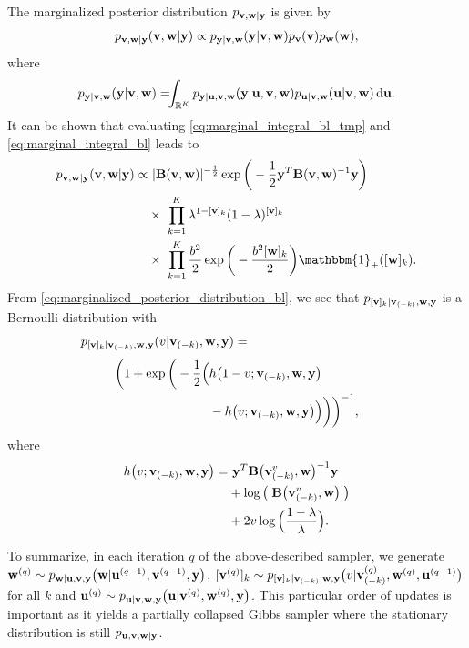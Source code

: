 \documentclass[journal]{IEEEtran}
\begin{document}
The marginalized posterior distribution $p_{{\bf{v}}, {\bf{w}} | {\bf{y}}}$ is given by
\begin{align}\label{eq:marginal_integral_bl_tmp}
    p_{{\bf{v}}, {\bf{w}} | {\bf{y}}}({\bf{v}}, {\bf{w}} | {\bf{y}}) \propto p_{{\bf{y}}|{\bf{v}}, {\bf{w}}}({\bf{y}}|{\bf{v}}, {\bf{w}}) p_{{\bf{v}}}({\bf{v}}) p_{{\bf{w}}}({\bf{w}}),
\end{align}
where
\begin{equation}\label{eq:marginal_integral_bl}
    p_{\M y|\M v, \M w}(\M y|\M v, \M w) = \hspace{-0.15cm} \int_{\R^K} p_{\M y|\M u, \M v, \M w}(\M y | \M u, \M v, \M w) p_{\M u|\M v, \M w}(\M u|\M v, \M w) \ud \M u.
\end{equation}
It can be shown that evaluating \eqref{eq:marginal_integral_bl_tmp} and \eqref{eq:marginal_integral_bl} leads to
\begin{align}\label{eq:marginalized_posterior_distribution_bl}
    p_{\M v, \M w | \M y}(\M v, \M w | \M y) \propto& \ |\M B(\M v, \M w)|^{-\frac{1}{2}} \exp\bigg(-\frac{1}{2} \M y^{T} \M B(\M v, \M w)^{-1} \M y \bigg) \nonumber \\
    &\times \ \prod_{k=1}^{K} \lambda^{1-[\M v]_k}(1-\lambda)^{[\M v]_k} \nonumber \\
    &\times \ \prod_{k=1}^{K} \frac{b^2}{2}\exp\bigg(-\frac{b^2 [\M w]_k}{2}\bigg) \mathbbm{1}_{+}([\M w]_k).
\end{align}
From \eqref{eq:marginalized_posterior_distribution_bl}, we see that $p_{[{\bf{v}}]_k | {\bf{v}}_{(-k)}, {\bf{w}}, {\bf{y}}}$ is a Bernoulli distribution with
\begin{align*}
    p_{[\M v]_k | \M v_{(-k)}, \M w, \M y}(v|\M v_{(-k)}, \M w, \M y) = \hspace{4cm}
\end{align*}
\begin{align}
    \bigg(1 + \exp\bigg(-\frac{1}{2}\Big(&h\big(1-v; {\bf{v}}_{(-k)}, {\bf{w}}, {\bf{y}}\big) \nonumber \\
    &- h\big(v; {\bf{v}}_{(-k)}, {\bf{w}}, {\bf{y}}\big)\Big)\bigg)\bigg)^{-1},
\end{align}
where
\begin{align}
    h\big(v; {\bf{v}}_{(-k)}, {\bf{w}}, {\bf{y}}\big) =& \ {\bf{y}}^{T} {\bf{B}}\big({\bf{v}}_{(-k)}^{v}, {\bf{w}}\big)^{-1} {\bf{y}} \nonumber \\
    &+ \log\big(|{\bf{B}}\big({\bf{v}}_{(-k)}^{v}, {\bf{w}}\big)|\big) \nonumber \\
    &+ 2 v \log\Big(\frac{1-\lambda}{\lambda}\Big).
\end{align}

To summarize, in each iteration $q$ of the above-described sampler, we generate ${\bf{w}}^{(q)} \sim p_{{\bf{w}} | {\bf{u}}, {\bf{v}}, {\bf{y}}}\big({\bf{w}} | {\bf{u}}^{(q-1)}, {\bf{v}}^{(q-1)}, {\bf{y}}\big)$, $[{\bf{v}}^{(q)}]_k \sim p_{[{\bf{v}}]_k | {\bf{v}}_{(-k)}, {\bf{w}}, {\bf{y}}}\big(v | {\bf{v}}_{(-k)}^{(q)}, {\bf{w}}^{(q)}, {\bf{u}}^{(q-1)}\big)$ for all $k$ and ${\bf{u}}^{(q)} \sim p_{{\bf{u}} | {\bf{v}}, {\bf{w}},{\bf{y}}}\big({\bf{u}} | {\bf{v}}^{(q)}, {\bf{w}}^{(q)}, {\bf{y}}\big)$. This particular order of updates is important as it yields a partially collapsed Gibbs sampler \cite{van2008partially} where the stationary distribution is still $p_{{\bf{u}}, {\bf{v}}, {\bf{w}} | {\bf{y}}}$.
\end{document}
